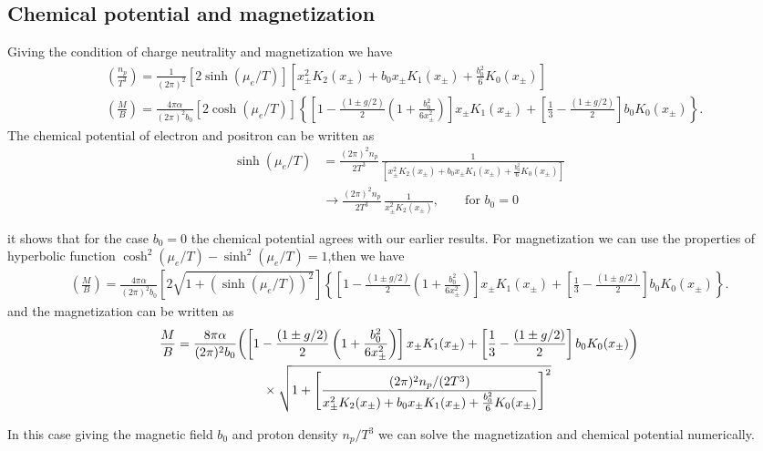 \documentclass[Universe,article,submit,moreauthors,pdftex]{Definitions/mdpi}
\begin{document}
\subsection{Chemical potential and magnetization}
Giving the condition of charge neutrality and magnetization we have
\begin{align}
&\left(\frac{n_p}{T^3}\right)=\frac{1}{(2\pi)^2}\left[2\sinh{(\mu_e/T)}\right]\left[x_\pm^2K_2(x_\pm)+b_0x_\pm K_1(x_\pm)+\frac{b^2_0}{6}K_0(x_\pm)\right]\\
&\left(\frac{M}{B}\right)=\frac{4\pi\alpha}{(2\pi)^2b_0}\left[2\cosh(\mu_e/T)\right]\left\{\left[1-\frac{(1\pm g/2)}{2}\left(1+\frac{b^2_0}{6x^2_\pm}\right)\right]x_\pm K_1(x_\pm)+\left[\frac{1}{3}-\frac{(1\pm g/2)}{2}\right]b_0K_0(x_\pm)\right\}.
\end{align}
The chemical potential of electron and positron can be written as
\begin{align}
\sinh{(\mu_e/T)}&=\frac{(2\pi)^2n_p}{2T^3}\,\frac{1}{\left[x_\pm^2K_2(x_\pm)+b_0x_\pm K_1(x_\pm)+\frac{b^2_0}{6}K_0(x_\pm)\right]}\\
&\longrightarrow\frac{(2\pi)^2n_p}{2T^3}\,\frac{1}{x_\pm^2K_2(x_\pm)},\qquad \mathrm{for}\,\,b_0=0
\end{align}

it shows that for the case $b_0=0$ the chemical potential agrees with our earlier results. For magnetization we can use the properties of hyperbolic function $\cosh^2(\mu_e/T)-\sinh^2(\mu_e/T)=1$,then we have
\begin{align}
\left(\frac{M}{B}\right)=\frac{4\pi\alpha}{(2\pi)^2b_0}\left[2\sqrt{1+(\sinh(\mu_e/T))^2}\right]\left\{\left[1-\frac{(1\pm g/2)}{2}\left(1+\frac{b^2_0}{6x^2_\pm}\right)\right]x_\pm K_1(x_\pm)+\left[\frac{1}{3}-\frac{(1\pm g/2)}{2}\right]b_0K_0(x_\pm)\right\}.\end{align}
and the magnetization can be written as
\begin{align}
\frac{M}{B}=\frac{8\pi\alpha}{(2\pi)^2b_0}&{\left(\left[1-\frac{(1\pm g/2)}{2}\left(1+\frac{b^2_0}{6x^2_\pm}\right)\right]x_\pm K_1(x_\pm)+\left[\frac{1}{3}-\frac{(1\pm g/2)}{2}\right]b_0K_0(x_\pm)\right)}\notag\\
&\qquad\times\sqrt{1+\left[\frac{{(2\pi)^2n_p}/{(2T^3)}}{x_\pm^2K_2(x_\pm)+b_0x_\pm K_1(x_\pm)+\frac{b^2_0}{6}K_0(x_\pm)}\right]^2}
\end{align}

In this case  giving the magnetic field $b_0$ and proton density $n_p/T^3$ we can solve the magnetization and chemical potential numerically.%
\end{document}
